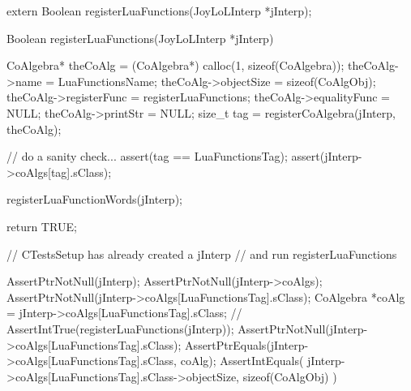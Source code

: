 \stoptyping

\startTestSuite[registerLuaFunctions]

\startCHeader
extern Boolean registerLuaFunctions(JoyLoLInterp *jInterp);
\stopCHeader
{}

\startCCode
Boolean registerLuaFunctions(JoyLoLInterp *jInterp) {
  CoAlgebra* theCoAlg    = (CoAlgebra*) calloc(1, sizeof(CoAlgebra));
  theCoAlg->name         = LuaFunctionsName;
  theCoAlg->objectSize   = sizeof(CoAlgObj);
  theCoAlg->registerFunc = registerLuaFunctions;
  theCoAlg->equalityFunc = NULL;
  theCoAlg->printStr     = NULL;
  size_t tag = registerCoAlgebra(jInterp, theCoAlg);

  // do a sanity check...
  assert(tag == LuaFunctionsTag);
  assert(jInterp->coAlgs[tag].sClass);
  
  registerLuaFunctionWords(jInterp);
  
  return TRUE;
}
\stopCCode


\startCTest
  // CTestsSetup has already created a jInterp
  // and run registerLuaFunctions
  
  AssertPtrNotNull(jInterp);
  AssertPtrNotNull(jInterp->coAlgs);
  AssertPtrNotNull(jInterp->coAlgs[LuaFunctionsTag].sClass);
  CoAlgebra *coAlg = jInterp->coAlgs[LuaFunctionsTag].sClass;
//  AssertIntTrue(registerLuaFunctions(jInterp));
  AssertPtrNotNull(jInterp->coAlgs[LuaFunctionsTag].sClass);
  AssertPtrEquals(jInterp->coAlgs[LuaFunctionsTag].sClass, coAlg);
  AssertIntEquals(
    jInterp->coAlgs[LuaFunctionsTag].sClass->objectSize,
    sizeof(CoAlgObj)
  )
\stopCTest
\stopTestCase
\stopTestSuite
